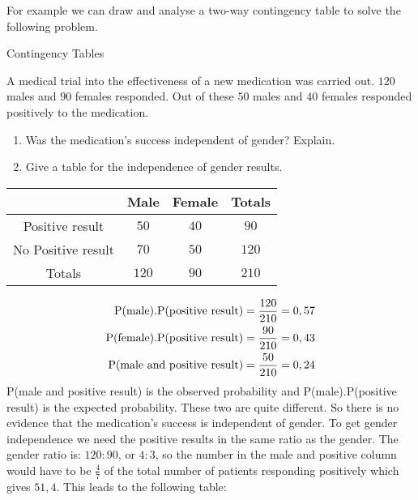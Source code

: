 
For example we can draw and analyse a two-way contingency table to solve the following problem.\\

\begin{wex}{Contingency Tables}
{A medical trial into the effectiveness of a new medication was carried out. $120$ males and $90$ females responded. Out of these $50$ males and $40$ females responded positively to the medication. 
\begin{enumerate}
\item Was the medication's success independent of gender? Explain.
\item Give a table for the independence of gender results.
\end{enumerate}}
{
\begin{center}
\begin{tabular}{|c|c|c|c|}
\hline
                   & Male & Female & Totals \\
\hline
Positive result    & $50$   & $40  $   & $90   $  \\
No Positive result & $70  $ & $50 $    & $120 $   \\
\hline
Totals             & $120$  & $90$     & $210$    \\
\hline
\end{tabular}
\end{center}
\begin{align*}
\text{P(male).P(positive result)} =\frac{120}{210}=0,57\\
\newline
\text{P(female).P(positive result)} =\frac{90}{210}=0,43\\
\newline
\text{P(male and positive result)} =\frac{50}{210}=0,24
\end{align*}
P(male and positive result) is the observed probability and P(male).P(positive result) is the expected probability. These two are quite different. So there is no evidence that the medication's success is independent of gender.
To get gender independence we need the positive results in the same ratio as the gender. The gender ratio is: $120:90$, or $4:3$, so the number in the male and positive column would have to be $\frac{4}{7}$ of the total number of patients responding positively which gives $51,4$. This leads to the following table:
}
\end{wex}
